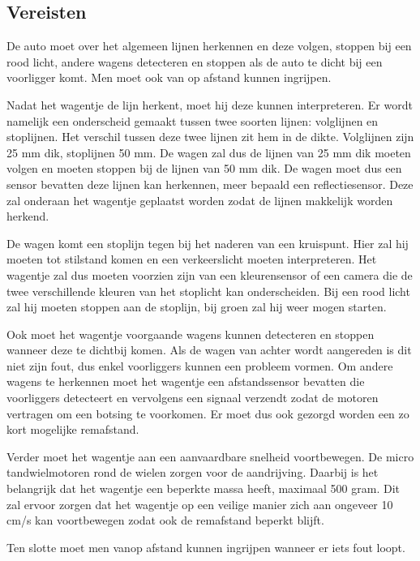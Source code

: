 \documentclass[a4paper,twoside,kulak]{kulakreport} %
\begin{document}
\subsection{Vereisten} %
De auto moet over het algemeen lijnen herkennen en deze volgen, stoppen bij een rood licht, andere wagens detecteren en stoppen als de auto te dicht bij een voorligger komt. Men moet ook van op afstand kunnen ingrijpen.

Nadat het wagentje de lijn herkent, moet hij deze kunnen interpreteren. Er wordt namelijk een onderscheid gemaakt tussen twee soorten lijnen: volglijnen en stoplijnen. Het verschil tussen deze twee lijnen zit hem in de dikte. Volglijnen zijn 25 mm dik, stoplijnen 50 mm. De wagen zal dus de lijnen van 25 mm dik moeten volgen en moeten stoppen bij de lijnen van 50 mm dik. De wagen moet dus een sensor bevatten deze lijnen kan herkennen, meer bepaald een reflectiesensor. Deze zal onderaan het wagentje geplaatst worden zodat de lijnen makkelijk worden herkend.

De wagen komt een stoplijn tegen bij het naderen van een kruispunt. Hier zal hij moeten tot stilstand komen en een verkeerslicht moeten interpreteren. Het wagentje zal dus moeten voorzien zijn van een kleurensensor of een camera die de twee verschillende kleuren van het stoplicht kan onderscheiden. Bij een rood licht zal hij moeten stoppen aan de stoplijn, bij groen zal hij weer mogen starten.

Ook moet het wagentje voorgaande wagens kunnen detecteren en stoppen wanneer deze te dichtbij komen. Als de wagen van achter wordt aangereden is dit niet zijn fout, dus enkel voorliggers kunnen een probleem vormen. Om andere wagens te herkennen moet het wagentje een afstandssensor bevatten die voorliggers detecteert en vervolgens een signaal verzendt zodat de motoren vertragen om een botsing te voorkomen. Er moet dus ook gezorgd worden een zo kort mogelijke remafstand.

Verder moet het wagentje aan een aanvaardbare snelheid voortbewegen. De micro tandwielmotoren rond de wielen zorgen voor de aandrijving. Daarbij is het belangrijk dat het wagentje een beperkte massa heeft, maximaal 500 gram. Dit zal ervoor zorgen dat het wagentje op een veilige manier zich aan ongeveer 10 cm/s kan voortbewegen zodat ook de remafstand beperkt blijft.

Ten slotte moet men vanop afstand kunnen ingrijpen wanneer er iets fout loopt.


\end{document}
